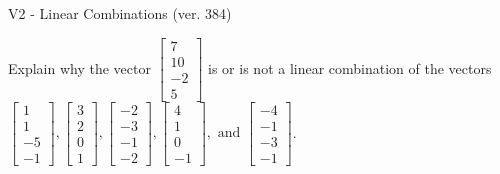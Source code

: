 \begin{exercise}
  \begin{exerciseTitle}V2 - Linear Combinations (ver. 384)\end{exerciseTitle}
  \begin{exerciseStatement}
    Explain why the vector \(\left[\begin{array}{c}
7 \\
10 \\
-2 \\
5
\end{array}\right]\)  is or is not a linear 
	combination of the vectors \(\left[\begin{array}{c}
1 \\
1 \\
-5 \\
-1
\end{array}\right] , \left[\begin{array}{c}
3 \\
2 \\
0 \\
1
\end{array}\right] , \left[\begin{array}{c}
-2 \\
-3 \\
-1 \\
-2
\end{array}\right] , \left[\begin{array}{c}
4 \\
1 \\
0 \\
-1
\end{array}\right] , \text{ and } \left[\begin{array}{c}
-4 \\
-1 \\
-3 \\
-1
\end{array}\right]\).
	



\end{exerciseStatement}
\end{exercise}
